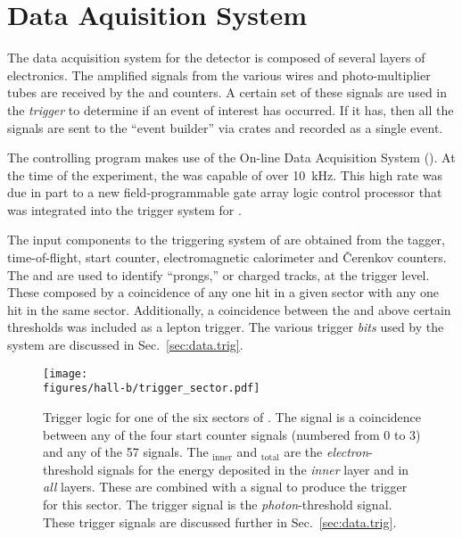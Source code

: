 \section{\label{sec:clas.daq}Data Aquisition System}

The data acquisition system for the  detector is composed of several layers of electronics. The amplified signals from the various wires and photo-multiplier tubes are received by the  and  counters. A certain set of these signals are used in the \emph{trigger} to determine if an event of interest has occurred. If it has, then all the signals are sent to the ``event builder'' via \label{abbr:camac}\cite{clas} crates and recorded as a single event.

The controlling program makes use of the  On-line Data Acquisition System (\label{abbr:coda})\cite{clas}. At the time of the  experiment, the  was capable of over 10~kHz. This high rate was due in part to a new field-programmable gate array \label{abbr:fpga} logic control processor that was integrated into the trigger system for \cite{clas.trig}.

The input components to the triggering system of  are obtained from the tagger, time-of-flight, start counter, electromagnetic calorimeter and \v{C}erenkov counters. The  and  are used to identify ``prongs,'' or charged tracks, at the trigger level. These composed by a coincidence of any one  hit in a given sector with any one  hit in the same sector. Additionally, a coincidence between the  and  above certain thresholds was included as a lepton trigger. The various trigger \emph{bits} used by the system are discussed in Sec.~\ref{sec:data.trig}.

\begin{figure}\begin{center}
\texttt{[image: \\figures/hall-b/trigger\_sector.pdf]}
\caption[Trigger Logic - One Sector]{\label{fig:clas.daq.trigsec}{}Trigger logic for one of the six sectors of . The  signal is a coincidence between any of the four start counter  signals (numbered from 0 to 3) and any of the 57   signals. The $_\mathrm{inner}$ and $_{\mathrm{total}}$ are the \emph{electron}-threshold  signals for the energy deposited in the \emph{inner} layer and in \emph{all} layers. These are combined with a  signal to produce the  trigger for this sector. The  trigger signal is the \emph{photon}-threshold  signal. These trigger signals are discussed further in Sec.~\ref{sec:data.trig}.}
\end{center}\end{figure}
